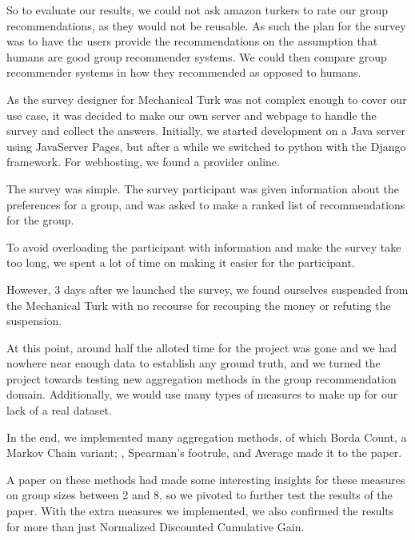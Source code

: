 \begin{titlepage}
\begin{adjustwidth*}{1.9cm}{1.9cm}
So to evaluate our results, we could not ask amazon turkers to rate our group recommendations, as they would not be reusable. As such the plan for the survey was to have the users provide the recommendations on the assumption that humans are good group recommender systems. We could then compare group recommender systems in how they recommended as opposed to humans.

As the survey designer for Mechanical Turk was not complex enough to cover our use case, it was decided to make our own server and webpage to handle the survey and collect the answers. Initially, we started development on a Java server using JavaServer Pages, but after a while we switched to python with the Django framework. For webhosting, we found a provider online.

The survey was simple. The survey participant was given information about the preferences for a group, and was asked to make a ranked list of recommendations for the group.

To avoid overloading the participant with information and make the survey take too long, we spent a lot of time on making it easier for the participant.

However, 3 days after we launched the survey, we found ourselves suspended from the Mechanical Turk with no recourse for recouping the money or refuting the suspension.

At this point, around half the alloted time for the project was gone and we had nowhere near enough data to establish any ground truth, and we turned the project towards testing new aggregation methods in the group recommendation domain. Additionally, we would use many types of measures to make up for our lack of a real dataset.

In the end, we implemented many aggregation methods, of which Borda Count, a Markov Chain variant; \MC, Spearman's footrule, and Average made it to the paper.

A paper on these methods had made some interesting insights for these measures on group sizes between 2 and 8, so we pivoted to further test the results of the paper. With the extra measures we implemented, we also confirmed the results for more than just Normalized Discounted Cumulative Gain.

\end{adjustwidth*}
\end{titlepage}